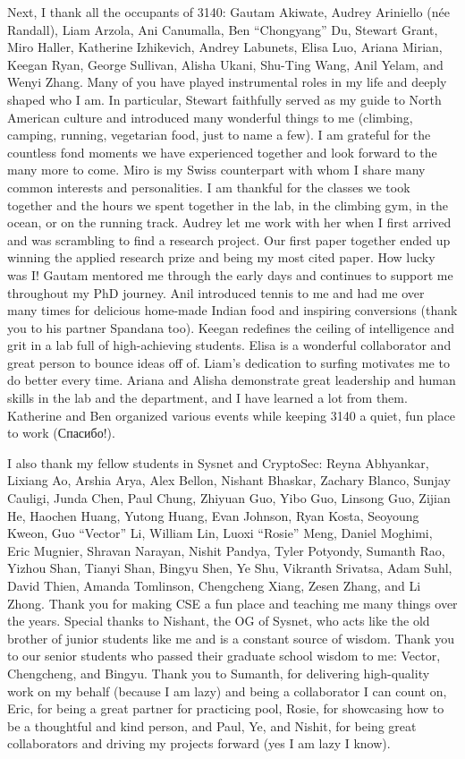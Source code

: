 \begin{acknowledgements}
Next, I thank all the occupants of 3140: Gautam Akiwate, Audrey Ariniello (née Randall), Liam Arzola, Ani Canumalla, Ben ``Chongyang'' Du, Stewart Grant, Miro Haller, Katherine Izhikevich, Andrey Labunets, Elisa Luo, Ariana Mirian, Keegan Ryan, George Sullivan, Alisha Ukani, Shu-Ting Wang, Anil Yelam, and Wenyi Zhang.
Many of you have played instrumental roles in my life and deeply shaped who I am. In particular, Stewart faithfully served as my guide to North American culture and introduced many wonderful things to me (climbing, camping, running, vegetarian food, just to name a few). I am grateful for the countless fond moments we have experienced together and look forward to the many more to come. Miro is my Swiss counterpart with whom I share many common interests and personalities. I am thankful for the classes we took together and the hours we spent together in the lab, in the climbing gym, in the ocean, or on the running track. Audrey let me work with her when I first arrived and was scrambling to find a research project. Our first paper together ended up winning the applied research prize and being my most cited paper. How lucky was I! Gautam mentored me through the early days and continues to support me throughout my PhD journey. Anil introduced tennis to me and had me over many times for delicious home-made Indian food and inspiring conversions (thank you to his partner Spandana too). Keegan redefines the ceiling of intelligence and grit in a lab full of high-achieving students. Elisa is a wonderful collaborator and great person to bounce ideas off of. Liam's dedication to surfing motivates me to do better every time. Ariana and Alisha demonstrate great leadership and human skills in the lab and the department, and I have learned a lot from them. Katherine and Ben organized various events while keeping 3140 a quiet, fun place to work ({Спасибо}!).

I also thank my fellow students in Sysnet and CryptoSec: Reyna Abhyankar, Lixiang Ao,  Arshia Arya, Alex Bellon, Nishant Bhaskar, Zachary Blanco, Sunjay Cauligi, Junda Chen, Paul Chung, Zhiyuan Guo, Yibo Guo, Linsong Guo, Zijian He, Haochen Huang, Yutong Huang, Evan Johnson, Ryan Kosta, Seoyoung Kweon, Guo ``Vector'' Li, William Lin, Luoxi ``Rosie'' Meng, Daniel Moghimi, Eric Mugnier, Shravan Narayan, Nishit Pandya, Tyler Potyondy, Sumanth Rao, Yizhou Shan, Tianyi Shan, Bingyu Shen, Ye Shu, Vikranth Srivatsa, Adam Suhl, David Thien, Amanda Tomlinson, Chengcheng Xiang, Zesen Zhang, and Li Zhong. Thank you for making CSE a fun place and teaching me many things over the years. Special thanks to Nishant, the OG of Sysnet, who acts like the old brother of junior students like me and is a constant source of wisdom. Thank you to our senior students who passed their graduate school wisdom to me: Vector, Chengcheng, and Bingyu. Thank you to Sumanth, for delivering high-quality work on my behalf (because I am lazy) and being a collaborator I can count on, Eric, for being a great partner for practicing pool, 
Rosie, for showcasing how to be a thoughtful and kind person, and Paul, Ye, and Nishit, for being great collaborators and driving my projects forward (yes I am lazy I know).


\end{acknowledgements}
